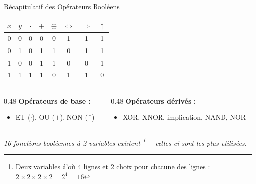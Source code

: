 \begin{frame}{Récapitulatif des Opérateurs Booléens}

    \centering
    \small
    \begin{tabular}{|c|c||c|c|c|c|c|c|}
        \hline
        \(x\) & \(y\) & \(\cdot\) & \(+\) & \(\oplus\) & \(\Leftrightarrow\) & \(\Rightarrow\) & \(\uparrow\) \\
        \hline
        0 & 0 & 0 & 0 & 0 & 1 & 1 & 1 \\
        0 & 1 & 0 & 1 & 1 & 0 & 1 & 1 \\
        1 & 0 & 0 & 1 & 1 & 0 & 0 & 1 \\
        1 & 1 & 1 & 1 & 0 & 1 & 1 & 0 \\
        \hline
    \end{tabular}

    \vspace{0.4cm}

    \begin{columns}[T]
        \begin{column}{0.48\textwidth}
            \textbf{Opérateurs de base :}
            \begin{itemize}
                \item ET (\(\cdot\)), OU (\(+\)), NON (\(\bar{\phantom{x}}\))
            \end{itemize}
        \end{column}
        \begin{column}{0.48\textwidth}
            \textbf{Opérateurs dérivés :}
            \begin{itemize}
                \item XOR, XNOR, implication, NAND, NOR
            \end{itemize}
        \end{column}
    \end{columns}

    \vspace{0.3cm}
    \centering
    \textit{16 fonctions booléennes à 2 variables existent  \footnote{Deux variables d'où 4 lignes et 2 choix pour \underline{chacune} des lignes : $2\times 2\times 2\times 2=2^4=16$}— celles-ci sont les plus utilisées.}

\end{frame}

